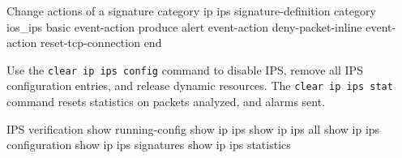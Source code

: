 \begin{sexylisting}{Change actions of a signature category}
ip ips signature-definition
  category ios_ips basic
    event-action produce alert
    event-action deny-packet-inline
    event-action reset-tcp-connection
end  
\end{sexylisting}

Use the \verb|clear ip ips config| command to disable IPS, remove all IPS configuration entries, and release dynamic resources. The \verb|clear ip ips stat| command resets statistics on packets analyzed, and alarms sent.

\begin{sexylisting}{IPS verification}
show running-config
show ip ips
show ip ips all
show ip ips configuration
show ip ips signatures
show ip ips statistics
\end{sexylisting}

